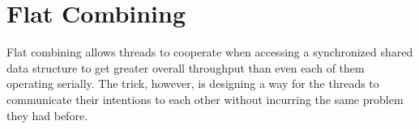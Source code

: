 \section{Flat Combining}

Flat combining allows threads to cooperate when accessing a synchronized shared data structure to get greater overall throughput than even each of them operating serially. The trick, however, is designing a way for the threads to communicate their intentions to each other without incurring the same problem they had before.